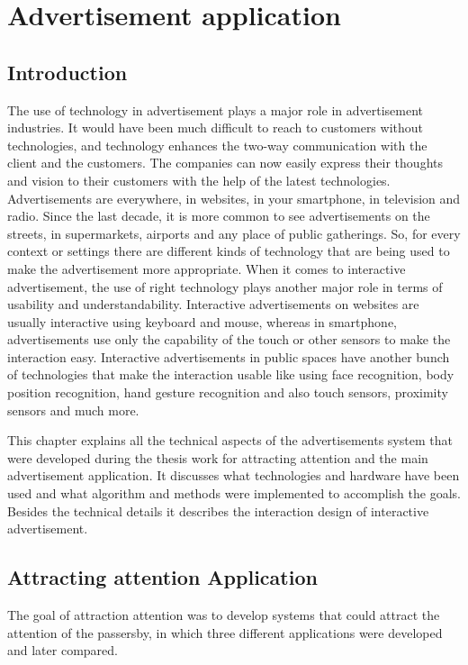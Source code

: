 \chapter{Advertisement application} %

\label{Chapter7} %
\newpage

\section{Introduction}
The use of technology in advertisement plays a major role in advertisement industries. It would have been much difficult to reach to customers without technologies, and technology enhances the two-way communication with the client and the customers. The companies can now easily express their thoughts and vision to their customers with the help of the latest technologies. Advertisements are everywhere, in websites, in your smartphone, in television and radio. Since the last decade, it is more common to see advertisements on the streets, in supermarkets, airports and any place of public gatherings.
So, for every context or settings there are different kinds of technology that are being used to make the advertisement more appropriate. When it comes to interactive advertisement, the use of right technology plays another major role in terms of usability and understandability. Interactive advertisements on websites are usually interactive using keyboard and mouse, whereas in smartphone, advertisements use only the capability of the touch or other sensors to make the interaction easy. Interactive advertisements in public spaces have another bunch of technologies that make the interaction usable like using face recognition, body position recognition, hand gesture recognition and also touch sensors, proximity sensors and much more.


This chapter explains all the technical aspects of the advertisements system that were developed during the thesis work for attracting attention and the main advertisement application. It discusses what technologies and hardware have been used and what algorithm and methods were implemented to accomplish the goals. Besides the technical details it describes the interaction design of interactive advertisement.



\iffalse
\section{Attracting attention Application}
The goal of attraction attention was to develop systems that could attract the attention of the passersby, in which three different applications were developed and later compared.

